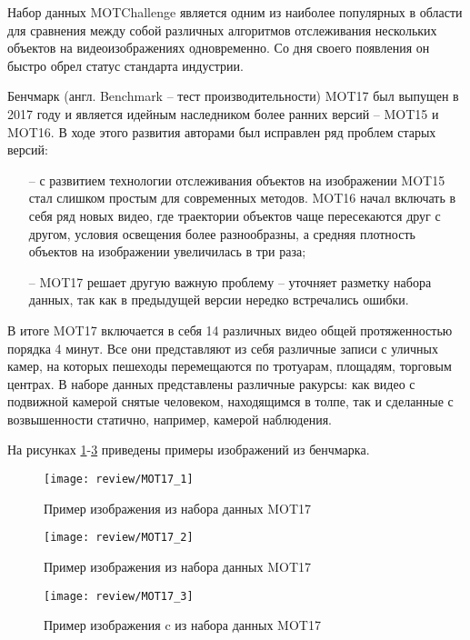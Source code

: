 Набор данных MOTChallenge \cite{dendorfer2021motchallenge} является одним из наиболее популярных в области для сравнения между собой различных алгоритмов отслеживания нескольких объектов на видеоизображениях одновременно. 
Со дня своего появления он быстро обрел статус стандарта индустрии. 

Бенчмарк (англ. Benchmark -- тест производительности) MOT17 был выпущен в 2017 году и является идейным наследником более ранних версий -- MOT15 и MOT16. В ходе этого развития авторами был исправлен ряд проблем старых версий:
\begin{itemize}
    \item[--] с развитием технологии отслеживания объектов на изображении MOT15 стал слишком простым для современных методов. MOT16 начал включать в себя ряд новых видео, где траектории объектов чаще пересекаются друг с другом, условия освещения более разнообразны, а средняя плотность объектов на изображении увеличилась в три раза;
    \item[--] MOT17 решает другую важную проблему -- уточняет разметку набора данных, так как в предыдущей версии нередко встречались ошибки. 
\end{itemize}

В итоге MOT17 включается в себя 14 различных видео общей протяженностью порядка 4 минут. Все они представляют из себя различные записи с уличных камер, на которых пешеходы перемещаются по тротуарам, площадям, торговым центрах. 
В наборе данных представлены различные ракурсы: как видео с подвижной камерой снятые человеком, находящимся в толпе, так и сделанные с возвышенности статично, например, камерой наблюдения.

На рисунках \ref{fig:mot_1}-\ref{fig:mot_3} приведены примеры изображений из бенчмарка.

\begin{figure}[ht]
    \centering
    \texttt{[image: review/MOT17\_1]}
    \caption{Пример изображения из набора данных MOT17 \cite[страница 850, рисунок 3]{dendorfer2021motchallenge}}
    \label{fig:mot_1}
\end{figure}

\begin{figure}[ht]
    \centering
    \texttt{[image: review/MOT17\_2]}
    \caption{Пример изображения из набора данных MOT17 \cite[страница 850, рисунок 3]{dendorfer2021motchallenge}}
    \label{fig:mot_2}
\end{figure}

\begin{figure}[ht]
    \centering
    \texttt{[image: review/MOT17\_3]}
    \caption{Пример изображения c из набора данных MOT17\cite[страница 850, рисунок 3]{dendorfer2021motchallenge}}
    \label{fig:mot_3}
\end{figure}

\FloatBarrier